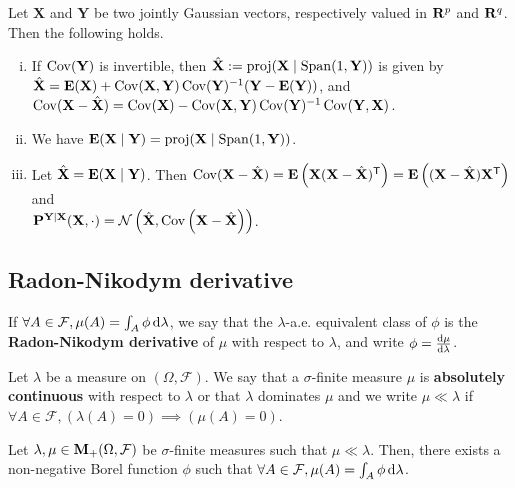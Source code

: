 	\begin{pop}
		Let $\mathbf{X}$ and $\mathbf{Y}$ be two jointly Gaussian vectors, respectively valued in $\mathbf{R}^p$ and $\mathbf{R}^q$.
		Then the following holds.
		\begin{enumerate}[(i)]
			\item
				If $\operatorname{Cov}(\mathbf{Y})$ is invertible, then $\hat{\mathbf{X}} := \operatorname{proj}(\mathbf{X} \mid \operatorname{Span}(1,\mathbf{Y}))$ is given by
				$\hat{\mathbf{X}} = \mathbf{E}(\mathbf{X}) + \operatorname{Cov}(\mathbf{X},\mathbf{Y}) \operatorname{Cov}(\mathbf{Y})^{-1} (\mathbf{Y} - \mathbf{E}(\mathbf{Y}))$, and
				$\operatorname{Cov}(\mathbf{X} - \hat{\mathbf{X}}) = \operatorname{Cov}(\mathbf{X}) - \operatorname{Cov}(\mathbf{X}, \mathbf{Y}) \operatorname{Cov}(\mathbf{Y})^{-1} \operatorname{Cov}(\mathbf{Y},\mathbf{X})$.
			\item We have $\mathbf{E}(\mathbf{X} \mid \mathbf{Y}) = \operatorname{proj}(\mathbf{X} \mid \operatorname{Span}(1,\mathbf{Y}))$.
			\item Let $\hat{\mathbf{X}} = \mathbf{E}(\mathbf{X} \mid \mathbf{Y})$.
				Then $\operatorname{Cov}(\mathbf{X} - \hat{\mathbf{X}}) = \mathbf{E} \left( \mathbf{X}(\mathbf{X} - \hat{\mathbf{X}})^\mathsf{T} \right) = \mathbf{E} \left( (\mathbf{X} - \hat{\mathbf{X}}) \mathbf{X}^\mathsf{T} \right)$
				and\\ $\mathbf{P}^{\mathbf{Y} \mid \mathbf{X}}(\mathbf{X},\cdot) = \mathcal{N} \left( \hat{\mathbf{X}}, \operatorname{Cov} \left( \mathbf{X} - \hat{\mathbf{X}} \right) \right)$.
		\end{enumerate}
	\end{pop}


\subsection{Radon-Nikodym derivative}

	\begin{defn}
		If $\forall A \in \mathcal{F}, \mu(A) = \int_A \phi \mathop{}\mathopen{}\mathrm{d} \lambda$, we say that the $\lambda$-a.e. equivalent class of $\phi$ is the \textbf{Radon-Nikodym derivative} of $\mu$ with respect to $\lambda$, and write $\phi = \frac{\mathop{}\mathopen{}\mathrm{d} \mu}{\mathop{}\mathopen{}\mathrm{d} \lambda}$.
	\end{defn}

	\begin{defn}
		Let $\lambda$ be a measure on $(\Omega,\mathcal{F})$.
		We say that a $\sigma$-finite measure $\mu$ is \textbf{absolutely continuous} with respect to $\lambda$ or that $\lambda$ dominates $\mu$ and we write $\mu \ll \lambda$ if $\forall A \in \mathcal{F}, (\lambda(A) = 0) \implies (\mu(A) = 0)$.
	\end{defn}
	
	\begin{thm}
		Let $\lambda, \mu \in \mathbf{M}_+(\Omega,\mathcal{F})$ be $\sigma$-finite measures such that $\mu \ll \lambda$.
		Then, there exists a non-negative Borel function $\phi$ such that $\forall A \in \mathcal{F}, \mu(A) = \int_A \phi \mathop{}\mathopen{}\mathrm{d} \lambda$.
	\end{thm}
	
